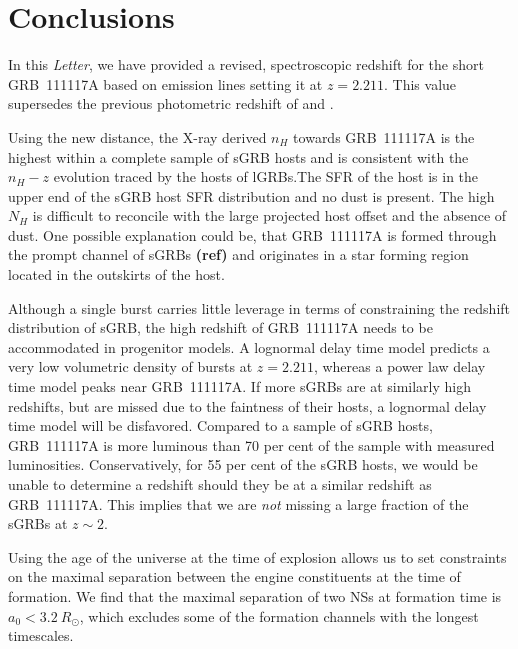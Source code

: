 \documentclass{aa}    %
\newcommand\todo[1]{\textbf{(#1)}}
\begin{document}
\section{Conclusions}

In this \emph{Letter}, we have provided a revised, spectroscopic redshift for
the short GRB~111117A based on emission lines setting it at $z = 2.211$. This
value supersedes the previous photometric redshift of \citet{Margutti2012} and
\citet{Sakamoto2013}. %

Using the new distance, the X-ray derived $n_H$ towards GRB~111117A is the
highest within a complete sample of sGRB hosts and is consistent with the
$n_H-z$ evolution traced by the hosts of lGRBs.The SFR of the host is in the
upper end of the sGRB host SFR distribution and no dust is present. The high
$N_H$ is difficult to reconcile with the large projected host offset and the
absence of dust. One possible explanation could be, that GRB~111117A is formed
through the prompt channel of sGRBs \todo{ref} and originates in a star forming
region located in the outskirts of the host.

Although a single burst carries little leverage in terms of constraining the
redshift distribution of sGRB, the high redshift of GRB~111117A needs to be
accommodated in progenitor models. A lognormal delay time model predicts a very low volumetric
density of bursts at $z = 2.211$, whereas a power law delay time model peaks
near GRB~111117A. If more sGRBs are at similarly high redshifts, but are missed due to
the faintness of their hosts, a lognormal delay time model will be disfavored.
Compared to a sample of sGRB hosts, GRB~111117A is more luminous than 70 per
cent of the sample with measured luminosities. Conservatively, for 55 per
cent of the sGRB hosts, we would be unable to determine a redshift should they be at 
a similar redshift as GRB~111117A. This implies that we are \textit{not} missing a large
fraction of the sGRBs at $z \sim 2$.

Using the age of the universe at the time of explosion allows us to set
constraints on the maximal separation between the engine constituents at the
time of formation. We find that the maximal separation of two NSs at
formation time is $a_0 < 3.2~R_\odot$, which excludes some of the formation
channels with the longest timescales.
\end{document}
